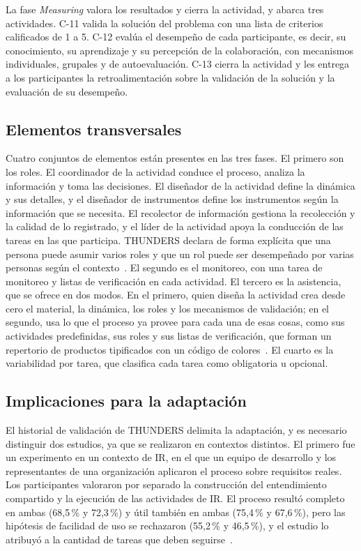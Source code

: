 \documentclass[12pt,letterpaper,oneside]{report}
\begin{document}
La fase \textit{Measuring} valora los resultados y cierra la actividad, y
abarca tres actividades. C-11 valida la solución del problema con una lista de
criterios calificados de 1 a 5. C-12 evalúa el desempeño de cada participante,
es decir, su conocimiento, su aprendizaje y su percepción de la colaboración,
con mecanismos individuales, grupales y de autoevaluación. C-13 cierra la
actividad y les entrega a los participantes la retroalimentación sobre la
validación de la solución y la evaluación de su desempeño.

\subsection{Elementos transversales}
\label{sec:base_transversales}
Cuatro conjuntos de elementos están presentes en las tres fases. El primero son los
roles. El coordinador de la actividad conduce el proceso, analiza la información y toma
las decisiones. El diseñador de la actividad define la dinámica y sus detalles,
y el diseñador de instrumentos define los instrumentos según la información que
se necesita. El recolector de información gestiona la recolección y la calidad
de lo registrado, y el líder de la actividad apoya la conducción de las tareas
en las que participa. THUNDERS declara de forma
explícita que una persona puede asumir varios roles y que un rol puede ser
desempeñado por varias personas según el contexto~\cite{agredo2022thesis}. El
segundo es el monitoreo, con una tarea de monitoreo y listas de verificación en
cada actividad. El tercero es la asistencia, que se ofrece en dos modos. En el
primero, quien diseña la actividad crea desde cero el material, la dinámica, los
roles y los mecanismos de validación; en el segundo, usa lo que el proceso ya
provee para cada una de esas cosas, como sus actividades predefinidas, sus roles
y sus listas de verificación, que forman un repertorio de productos tipificados
con un código de colores~\cite{agredo2022thesis}. El cuarto es la variabilidad
por tarea, que clasifica cada tarea como obligatoria u opcional.

\subsection{Implicaciones para la adaptación}
\label{sec:implicaciones}
El historial de validación de THUNDERS delimita la adaptación, y es necesario
distinguir dos estudios, ya que se realizaron en contextos distintos. El primero
fue un experimento en un contexto de IR, en el que un equipo de desarrollo y
los representantes de una organización aplicaron el proceso sobre requisitos
reales. Los participantes valoraron por separado la construcción del
entendimiento compartido y la ejecución de las actividades de IR. El proceso
resultó completo en ambas (68,5\,\% y 72,3\,\%) y útil también en ambas
(75,4\,\% y 67,6\,\%), pero las hipótesis de facilidad de uso se rechazaron
(55,2\,\% y 46,5\,\%), y el estudio lo atribuyó a la cantidad de tareas que
deben seguirse~\cite{agredo2022thesis,agredo2023strategy}.
\end{document}
